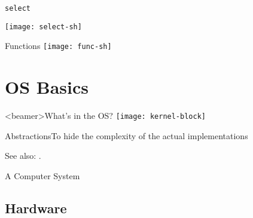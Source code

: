 \begin{frame}{\texttt{select}}
  \begin{center}
    \texttt{[image: select-sh]}
  \end{center}
\end{frame}

\begin{frame}{Functions}
  \texttt{[image: func-sh]}
\end{frame}

\section{OS Basics}
\label{sec:os-basics}

\begin{frame}<beamer>{What's in the OS?}
  \centering
  \texttt{[image: kernel-block]}
\end{frame}

\begin{frame}{Abstractions}{To hide the complexity of the actual implementations}
  \begin{center}
  \end{center}
\end{frame}

See also: .

\begin{frame}{A Computer System}
  \begin{center}
  \end{center}
\end{frame}

\subsection{Hardware}
\label{sec:cpu}

